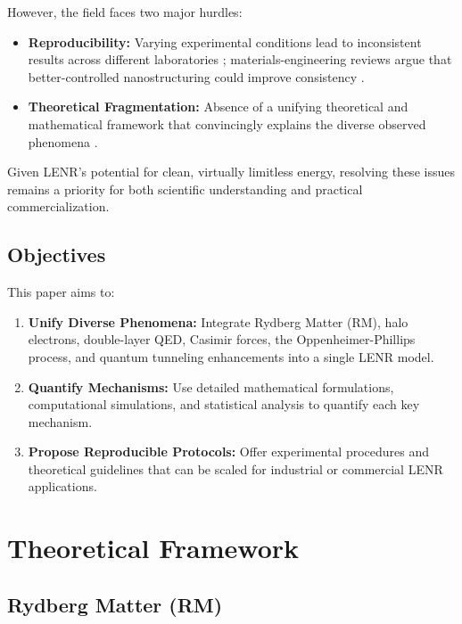 \documentclass[11pt,a4paper]{article}
\begin{document}
However, the field faces two major hurdles:

\begin{itemize}
\item
  \textbf{Reproducibility:} Varying experimental conditions lead to inconsistent results across different laboratories \citep{storms2010,bellucci2023}; materials-engineering reviews argue that better-controlled nanostructuring could improve consistency \citep{bakranov2024}.
\item
  \textbf{Theoretical Fragmentation:} Absence of a unifying theoretical and mathematical framework that convincingly explains the diverse observed phenomena \citep{hagelstein2015,widom2006}.
\end{itemize}

Given LENR's potential for clean, virtually limitless energy, resolving these issues remains a priority for both scientific understanding and practical commercialization.

\subsection{Objectives}

This paper aims to:

\begin{enumerate}
\def\labelenumi{\arabic{enumi}.}
\item
  \textbf{Unify Diverse Phenomena:} Integrate Rydberg Matter (RM), halo electrons, double-layer QED, Casimir forces, the Oppenheimer-Phillips process, and quantum tunneling enhancements into a single LENR model.
\item
  \textbf{Quantify Mechanisms:} Use detailed mathematical formulations, computational simulations, and statistical analysis to quantify each key mechanism.
\item
  \textbf{Propose Reproducible Protocols:} Offer experimental procedures and theoretical guidelines that can be scaled for industrial or commercial LENR applications.
\end{enumerate}

\section{Theoretical Framework}

\subsection{Rydberg Matter (RM)}
\end{document}
